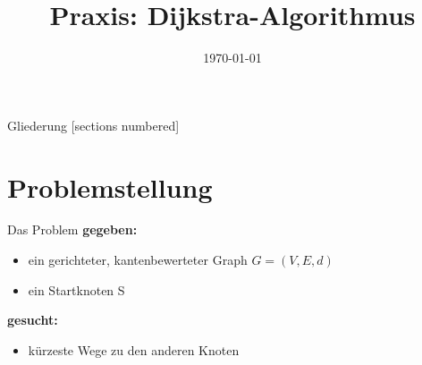 



\title{Praxis: Dijkstra-Algorithmus}
\date{\today}

\usepackage{tikz} \usetikzlibrary{arrows, positioning}







\maketitle

\begin{frame}{Gliederung}
    [sections numbered]
    \tableofcontents
\end{frame}

\section{Problemstellung}

\begin{frame}{Das Problem}
	\textbf{gegeben:} 
	\begin{itemize}
		\item ein gerichteter, kantenbewerteter Graph $G = (V, E, d)$
		\item ein Startknoten S
	\end{itemize}
	\textbf{gesucht:} \\
	\begin{itemize}
		\item kürzeste Wege zu den anderen Knoten
	\end{itemize}

\end{frame}


